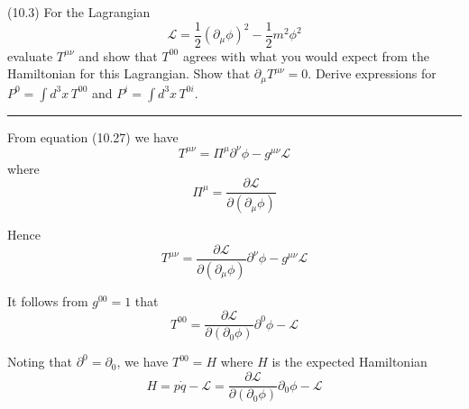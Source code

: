\documentclass[12pt]{article}
\begin{document}
(10.3)
For the Lagrangian
\begin{equation*}
\mathcal L=\frac{1}{2}(\partial_\mu\phi)^2-\frac{1}{2}m^2\phi^2
\tag{10.42}
\end{equation*}
evaluate $T^{\mu\nu}$ and show that $T^{00}$ agrees with what
you would expect from the Hamiltonian for this Lagrangian.
Show that $\partial_\mu T^{\mu\nu}=0$. Derive expressions
for $P^0=\int d^3x\,T^{00}$ and $P^i=\int d^3x\,T^{0i}$.

\bigskip
\hrule

\bigskip
From equation (10.27) we have
\begin{equation*}
T^{\mu\nu}=\Pi^\mu\partial^\nu\phi-g^{\mu\nu}\mathcal L
\end{equation*}
where
\begin{equation*}
\Pi^\mu=\frac{\partial\mathcal L}{\partial(\partial_\mu\phi)}
\end{equation*}

Hence
\begin{equation*}
T^{\mu\nu}=\frac{\partial\mathcal L}{\partial(\partial_\mu\phi)}\partial^\nu\phi-g^{\mu\nu}\mathcal L
\end{equation*}

It follows from $g^{00}=1$ that
\begin{equation*}
T^{00}=\frac{\partial\mathcal L}{\partial(\partial_0\phi)}\partial^0\phi-\mathcal L
\end{equation*}

Noting that $\partial^0=\partial_0$, we have $T^{00}=H$ where $H$ is the expected Hamiltonian
\begin{equation*}
H=p\dot q-\mathcal L=\frac{\partial\mathcal L}{\partial(\partial_0\phi)}\partial_0\phi-\mathcal L
\end{equation*}
\end{document}
